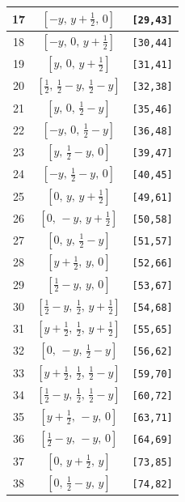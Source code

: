 \documentclass[fleqn,8pt]{jsarticle}
\begin{document}
\begin{longtable}{ccc}
17 & $\left[ - y,\, y + \frac{1}{2},\, 0 \right]$ & {\tt [29,43]} \\ \hline
18 & $\left[ - y,\, 0,\, y + \frac{1}{2} \right]$ & {\tt [30,44]} \\ \hline
19 & $\left[ y,\, 0,\, y + \frac{1}{2} \right]$ & {\tt [31,41]} \\ \hline
20 & $\left[ \frac{1}{2},\, \frac{1}{2} - y,\, \frac{1}{2} - y \right]$ & {\tt [32,38]} \\ \hline
21 & $\left[ y,\, 0,\, \frac{1}{2} - y \right]$ & {\tt [35,46]} \\ \hline
22 & $\left[ - y,\, 0,\, \frac{1}{2} - y \right]$ & {\tt [36,48]} \\ \hline
23 & $\left[ y,\, \frac{1}{2} - y,\, 0 \right]$ & {\tt [39,47]} \\ \hline
24 & $\left[ - y,\, \frac{1}{2} - y,\, 0 \right]$ & {\tt [40,45]} \\ \hline
25 & $\left[ 0,\, y,\, y + \frac{1}{2} \right]$ & {\tt [49,61]} \\ \hline
26 & $\left[ 0,\, - y,\, y + \frac{1}{2} \right]$ & {\tt [50,58]} \\ \hline
27 & $\left[ 0,\, y,\, \frac{1}{2} - y \right]$ & {\tt [51,57]} \\ \hline
28 & $\left[ y + \frac{1}{2},\, y,\, 0 \right]$ & {\tt [52,66]} \\ \hline
29 & $\left[ \frac{1}{2} - y,\, y,\, 0 \right]$ & {\tt [53,67]} \\ \hline
30 & $\left[ \frac{1}{2} - y,\, \frac{1}{2},\, y + \frac{1}{2} \right]$ & {\tt [54,68]} \\ \hline
31 & $\left[ y + \frac{1}{2},\, \frac{1}{2},\, y + \frac{1}{2} \right]$ & {\tt [55,65]} \\ \hline
32 & $\left[ 0,\, - y,\, \frac{1}{2} - y \right]$ & {\tt [56,62]} \\ \hline
33 & $\left[ y + \frac{1}{2},\, \frac{1}{2},\, \frac{1}{2} - y \right]$ & {\tt [59,70]} \\ \hline
34 & $\left[ \frac{1}{2} - y,\, \frac{1}{2},\, \frac{1}{2} - y \right]$ & {\tt [60,72]} \\ \hline
35 & $\left[ y + \frac{1}{2},\, - y,\, 0 \right]$ & {\tt [63,71]} \\ \hline
36 & $\left[ \frac{1}{2} - y,\, - y,\, 0 \right]$ & {\tt [64,69]} \\ \hline
37 & $\left[ 0,\, y + \frac{1}{2},\, y \right]$ & {\tt [73,85]} \\ \hline
38 & $\left[ 0,\, \frac{1}{2} - y,\, y \right]$ & {\tt [74,82]} \\ \hline

\end{longtable}
\end{document}

